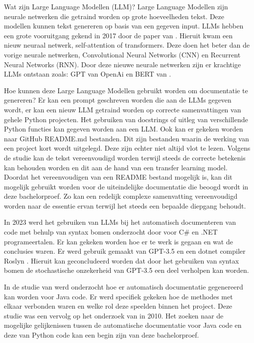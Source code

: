 Wat zijn Large Language Modellen (LLM)?
Large Language Modellen zijn neurale netwerken die getraind worden op grote hoeveelheden tekst. 
Deze modellen kunnen tekst genereren op basis van een gegeven input. 
LLMs hebben een grote vooruitgang gekend in 2017 door de paper van \textcite{VaswaniEtAl2017}. 
Hieruit kwam een nieuw neuraal netwerk, self-attention of transformers. 
Deze doen het beter dan de vorige neurale netwerken, Convolutional Neural Networks (CNN) en Recurrent Neural Networks (RNN).
Door deze nieuwe neurale netwerken zijn er krachtige LLMs ontstaan zoals: GPT van OpenAi  \autocite{RandfordEtAL2018} en BERT van \textcite{DevlinEtAl2019}.

Hoe kunnen deze Large Language Modellen gebruikt worden om documentatie te genereren?
Er kan een prompt geschreven worden die aan de LLMs gegeven wordt, er kan een nieuw LLM getraind worden op correcte samenvattingen van gehele Python projecten.
Het gebruiken van docstrings of uitleg van verschillende Python functies kan gegeven worden aan een LLM. 
Ook kan er gekeken worden naar GitHub README.md bestanden. Dit zijn bestanden waarin de werking van een project kort wordt uitgelegd. Deze zijn echter niet altijd vlot te lezen. 
Volgens de studie \textcite{GaoEtAl2023} kan de tekst vereenvoudigd worden terwijl steeds de correcte betekenis kan behouden worden en dit aan de hand van een transfer learning model.
Doordat het vereenvoudigen van een README bestand mogelijk is, kan dit mogelijk gebruikt worden voor de uiteindelijke documentatie die beoogd wordt in deze bachelorproef. 
Zo kan een redelijk complexe samenvatting vereenvoudigd worden naar de essentie ervan terwijl het steeds een bepaalde diepgang behoudt. 

In 2023 werd het gebruiken van LLMs bij het automatisch documenteren van code met behulp van syntax bomen onderzocht door \textcite{Procko2023} voor C\# en .NET programeertalen.
Er kan gekeken worden hoe er te werk is gegaan en wat de conclusies waren. Er werd gebruik gemaakt van GPT-3.5 en een dotnet compiler Roslyn \autocite{Roslyn}. 
Hieruit kan geconcludeerd worden dat door het gebruiken van syntax bomen de stochastische onzekerheid van GPT-3.5 een deel verholpen kan worden. 

In de studie van \textcite{McBurneyMcMillan2014} werd onderzocht hoe er automatisch documentatie gegenereerd kan worden voor Java code. 
Er werd specifiek gekeken hoe de methodes met elkaar verbonden waren en welke rol deze speelden binnen het project.
Deze studie was een vervolg op het onderzoek van \textcite{SridharaEtAL2010} in 2010.
Het zoeken naar de mogelijke gelijkenissen tussen de automatische documentatie voor Java code en deze van Python code kan een begin zijn van deze bachelorproef. 

